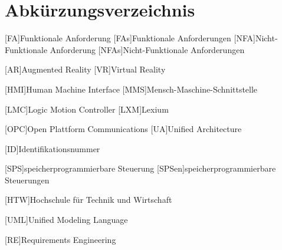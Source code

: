\documentclass[12pt, a4paper, twoside]{article} %
\begin{document}

\clearpage

\listoffigures
\clearpage

\listoftables
\clearpage

\section*{Abkürzungsverzeichnis}
\begin{acronym}[FA]
	[FA]{Funktionale Anforderung}
	[FAs]{Funktionale Anforderungen}
	[NFA]{Nicht-Funktionale Anforderung}
	[NFAs]{Nicht-Funktionale Anforderungen}
\end{acronym}
\begin{acronym}[VR]
	[AR]{Augmented Reality}
	[VR]{Virtual Reality}
\end{acronym}
\begin{acronym}[HMI]
	[HMI]{Human Machine Interface}
	[MMS]{Mensch-Maschine-Schnittstelle}
\end{acronym}
\begin{acronym}[LMC]
	[LMC]{Logic Motion Controller}
	[LXM]{Lexium}
\end{acronym}
\begin{acronym}[OPC]
	[OPC]{Open Plattform Communications}
	[UA]{Unified Architecture}
\end{acronym}
\begin{acronym}[ID]
	[ID]{Identifikationsnummer}
\end{acronym}
\begin{acronym}[SPS]
	[SPS]{speicherprogrammierbare Steuerung}
	[SPSen]{speicherprogrammierbare Steuerungen}
\end{acronym}
\begin{acronym}[HTW]
	[HTW]{Hochschule für Technik und Wirtschaft}
\end{acronym}
\begin{acronym}[UML]
	[UML]{Unified Modeling Language}
\end{acronym}
\begin{acronym}[RE]
	[RE]{Requirements Engineering}
\end{acronym}
\end{document}
